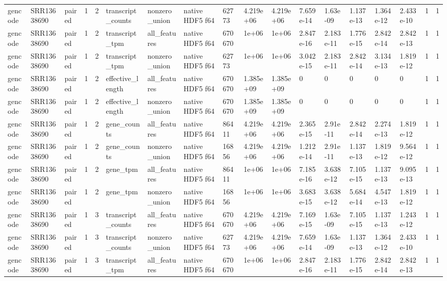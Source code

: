 \begin{tabular}{llllllllllllllllll}
gencode & SRR13638690 & paired & 1 & 2 & transcript\_counts & nonzero\_union & native HDF5 f64 & 62773 & 4.219e+06 & 4.219e+06 & 7.659e-14 & 1.63e-09 & 1.137e-13 & 1.364e-12 & 2.433e-10 & 1 & 1 \\
gencode & SRR13638690 & paired & 1 & 2 & transcript\_tpm & all\_features & native HDF5 f64 & 670670 & 1e+06 & 1e+06 & 2.847e-16 & 2.183e-11 & 1.776e-15 & 2.842e-14 & 2.842e-13 & 1 & 1 \\
gencode & SRR13638690 & paired & 1 & 2 & transcript\_tpm & nonzero\_union & native HDF5 f64 & 62773 & 1e+06 & 1e+06 & 3.042e-15 & 2.183e-11 & 2.842e-14 & 3.134e-13 & 1.819e-12 & 1 & 1 \\
gencode & SRR13638690 & paired & 1 & 2 & effective\_length & all\_features & native HDF5 f64 & 670670 & 1.385e+09 & 1.385e+09 & 0 & 0 & 0 & 0 & 0 & 1 & 1 \\
gencode & SRR13638690 & paired & 1 & 2 & effective\_length & nonzero\_union & native HDF5 f64 & 670670 & 1.385e+09 & 1.385e+09 & 0 & 0 & 0 & 0 & 0 & 1 & 1 \\
gencode & SRR13638690 & paired & 1 & 2 & gene\_counts & all\_features & native HDF5 f64 & 86411 & 4.219e+06 & 4.219e+06 & 2.365e-15 & 2.91e-11 & 2.842e-14 & 2.274e-13 & 1.819e-12 & 1 & 1 \\
gencode & SRR13638690 & paired & 1 & 2 & gene\_counts & nonzero\_union & native HDF5 f64 & 16856 & 4.219e+06 & 4.219e+06 & 1.212e-14 & 2.91e-11 & 1.137e-13 & 1.819e-12 & 9.564e-12 & 1 & 1 \\
gencode & SRR13638690 & paired & 1 & 2 & gene\_tpm & all\_features & native HDF5 f64 & 86411 & 1e+06 & 1e+06 & 7.185e-16 & 3.638e-12 & 7.105e-15 & 1.137e-13 & 9.095e-13 & 1 & 1 \\
gencode & SRR13638690 & paired & 1 & 2 & gene\_tpm & nonzero\_union & native HDF5 f64 & 16856 & 1e+06 & 1e+06 & 3.683e-15 & 3.638e-12 & 5.684e-14 & 4.547e-13 & 1.819e-12 & 1 & 1 \\
gencode & SRR13638690 & paired & 1 & 3 & transcript\_counts & all\_features & native HDF5 f64 & 670670 & 4.219e+06 & 4.219e+06 & 7.169e-15 & 1.63e-09 & 7.105e-15 & 1.137e-13 & 1.243e-12 & 1 & 1 \\
gencode & SRR13638690 & paired & 1 & 3 & transcript\_counts & nonzero\_union & native HDF5 f64 & 62773 & 4.219e+06 & 4.219e+06 & 7.659e-14 & 1.63e-09 & 1.137e-13 & 1.364e-12 & 2.433e-10 & 1 & 1 \\
gencode & SRR13638690 & paired & 1 & 3 & transcript\_tpm & all\_features & native HDF5 f64 & 670670 & 1e+06 & 1e+06 & 2.847e-16 & 2.183e-11 & 1.776e-15 & 2.842e-14 & 2.842e-13 & 1 & 1 \\

\end{tabular}
